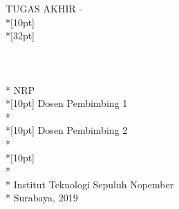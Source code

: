 \newpage

	\sffamily
	\thispagestyle{empty}
	{ \noindent TUGAS AKHIR - \kodematkul }\\*[10pt] 
	{\large\textbf{\MakeUppercase{\judulcover}}} \\*[32pt]
	\\
	\\
	\\
	\MakeUppercase{\penulis} \\*
	NRP \nrp \\*[10pt]
	Dosen Pembimbing 1 \\*
	\pembimbingsatu \\*[10pt]
	Dosen Pembimbing 2 \\*
	\pembimbingdua \\*[10pt]
	\MakeUppercase{\jurusan} \\*
	\fakultas \\*
	Institut Teknologi Sepuluh Nopember \\*
	Surabaya, 2019
	\rmfamily
	\normalsize
	\restoregeometry
	\color{black}
	\cleardoublepage

